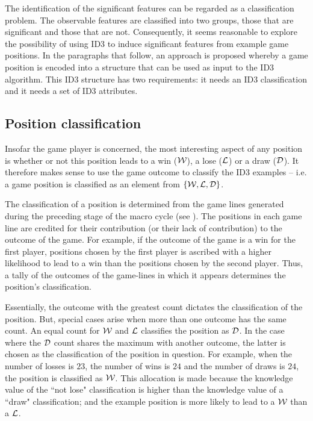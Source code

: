 The identification of the significant features can be regarded as a classification problem.  The observable features are classified into two groups, those that are significant and those that are not.  Consequently, it seems reasonable to explore the possibility of using ID3 to induce significant features from example game positions.  In the paragraphs that follow, an approach is proposed whereby a game position is encoded into a structure that can be used as input to the ID3 algorithm.  This ID3 structure has two requirements: it needs an ID3 classification and it needs a set of ID3 attributes. 

\subsection{Position classification}
\label{sec:pos_class}
Insofar the game player is concerned, the most interesting aspect of any position is whether or not this position leads to a win (${\mathcal W}$), a lose (${\mathcal L}$) or a draw (${\mathcal D}$). It therefore makes sense to use the game outcome to classify the ID3 examples -- i.e. a game position is classified as an element from  $\{{\mathcal W},{\mathcal L},{\mathcal D}\}$. 

The classification of a position is determined from the game lines  generated during the preceding stage of the macro cycle (see ). The positions in each game line are credited for their contribution (or their lack of contribution) to the outcome of the game. For example, if the outcome of the game is a win for the first player, positions chosen by the first player is ascribed with a higher likelihood to lead to a win than the positions chosen by the second player.  Thus, a tally of the outcomes of the game-lines in which it appears determines the position's classification. 

Essentially, the outcome with the greatest count dictates the classification of the position.
But, special cases arise when more than one outcome has the same count. An equal count for ${\mathcal W}$ and ${\mathcal L}$ classifies the position as ${\mathcal D}$.  In the case where the ${\mathcal D}$ count shares the maximum with another outcome, the latter is chosen as the classification of the position in question.  For example, when the number of losses is $23$, the number of wins is $24$ and the number of draws is $24$, the position is classified as ${\mathcal W}$.  This allocation is made because the knowledge value of the ``not lose" classification is higher than the knowledge value of a ``draw" classification;  and the example position is more likely to lead to a ${\mathcal W}$ than a ${\mathcal L}$. 

